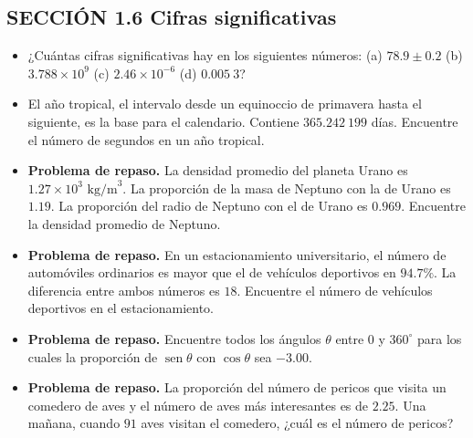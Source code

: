 \documentclass[11pt,a4paper]{article}
\begin{document}
\newpage

\subsection*{SECCIÓN 1.6 Cifras significativas}

\begin{itemize}
    \item[\textbf{20.}] ¿Cuántas cifras significativas hay en los siguientes números: (a) $78.9 \pm 0.2$ (b) $3.788 \times 10^9$ (c) $2.46 \times 10^{-6}$ (d) $0.005\ 3$?
    \vspace*{5cm}
    
    \item[\textbf{21.}] El año tropical, el intervalo desde un equinoccio de primavera hasta el siguiente, es la base para el calendario. Contiene $365.242\ 199$ días. Encuentre el número de segundos en un año tropical.
    \vspace*{5cm}
    
    \item[\textbf{22.}] \textbf{Problema de repaso.} La densidad promedio del planeta Urano es $1.27 \times 10^3 \text{ kg/m}^3$. La proporción de la masa de Neptuno con la de Urano es $1.19$. La proporción del radio de Neptuno con el de Urano es $0.969$. Encuentre la densidad promedio de Neptuno.
    \vspace*{6cm}
    
    \item[\textbf{23.}] \textbf{Problema de repaso.} En un estacionamiento universitario, el número de automóviles ordinarios es mayor que el de vehículos deportivos en $94.7\%$. La diferencia entre ambos números es $18$. Encuentre el número de vehículos deportivos en el estacionamiento.
    \vspace*{5cm}
    
    \item[\textbf{24.}] \textbf{Problema de repaso.} Encuentre todos los ángulos $\theta$ entre $0$ y $360^\circ$ para los cuales la proporción de $\operatorname{sen} \theta$ con $\cos \theta$ sea $-3.00$.
    \vspace*{5cm}
    
    \item[\textbf{25.}] \textbf{Problema de repaso.} La proporción del número de pericos que visita un comedero de aves y el número de aves más interesantes es de $2.25$. Una mañana, cuando $91$ aves visitan el comedero, ¿cuál es el número de pericos?
    \vspace*{5cm}
    

\end{itemize}
\end{document}
